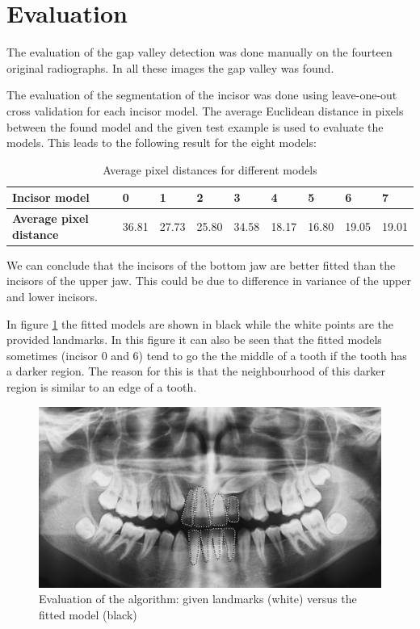 \documentclass[a4paper,10pt]{article}
\begin{document}
\clearpage
\section{Evaluation}
The evaluation of the gap valley detection was done manually on the fourteen original radiographs. In all these images the gap valley was found.

The evaluation of the segmentation of the incisor was done using leave-one-out cross validation for each incisor model. The average Euclidean distance in pixels between the found model and the given test example is used to evaluate the models. This leads to the following result for the eight models:


\begin{table}[h]
	\centering
	\begin{tabular}{l|llllllll}
		{\bf Incisor model}          & 0     & 1     & 2     & 3     & 4     & 5     & 6     & 7      \\ \hline
		{\bf Average pixel distance} & 36.81 & 27.73 & 25.80 & 34.58 & 18.17 & 16.80 & 19.05 & 19.01
	\end{tabular}
	\caption{Average pixel distances for different models}
\end{table}

We can conclude that the incisors of the bottom jaw are better fitted than the incisors of the upper jaw. This could be due to difference in variance of the upper and lower incisors.

In figure \ref{fig:evaluation} the fitted models are shown in black while the white points are the provided landmarks. In this figure it can also be seen that the fitted models sometimes (incisor 0 and 6) tend to go the the middle of a tooth if the tooth has a darker region. The reason for this is that the neighbourhood of this darker region is similar to an edge of a tooth.

\begin{figure}[htbp]
	\centering
	\includegraphics[width=1\textwidth, trim=400px 0 400px 200px, clip]{evaluation}
	\caption{Evaluation of the algorithm: given landmarks (white) versus the fitted model (black)}
	\label{fig:evaluation}
\end{figure}
\newpage

\nocite{*}

\end{document}
